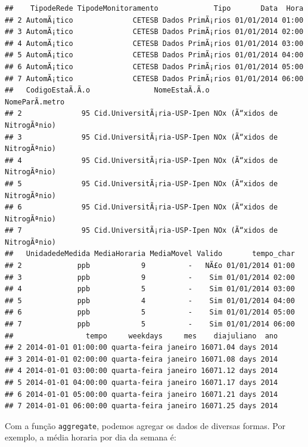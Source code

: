 \documentclass[]{book}
\newenvironment{Shaded}{\begin{snugshade}}{\end{snugshade}}
\newcommand{\KeywordTok}[1]{\textcolor[rgb]{0.13,0.29,0.53}{\textbf{#1}}}
\newcommand{\DataTypeTok}[1]{\textcolor[rgb]{0.13,0.29,0.53}{#1}}
\newcommand{\StringTok}[1]{\textcolor[rgb]{0.31,0.60,0.02}{#1}}
\newcommand{\OperatorTok}[1]{\textcolor[rgb]{0.81,0.36,0.00}{\textbf{#1}}}
\newcommand{\NormalTok}[1]{#1}
\theoremstyle{definition}
\theoremstyle{definition}
\theoremstyle{definition}
\theoremstyle{remark}
\begin{document}
\begin{verbatim}
##    TipodeRede TipodeMonitoramento             Tipo       Data  Hora
## 2 AutomÃ¡tico              CETESB Dados PrimÃ¡rios 01/01/2014 01:00
## 3 AutomÃ¡tico              CETESB Dados PrimÃ¡rios 01/01/2014 02:00
## 4 AutomÃ¡tico              CETESB Dados PrimÃ¡rios 01/01/2014 03:00
## 5 AutomÃ¡tico              CETESB Dados PrimÃ¡rios 01/01/2014 04:00
## 6 AutomÃ¡tico              CETESB Dados PrimÃ¡rios 01/01/2014 05:00
## 7 AutomÃ¡tico              CETESB Dados PrimÃ¡rios 01/01/2014 06:00
##   CodigoEstaÃ.Ã.o               NomeEstaÃ.Ã.o               NomeParÃ.metro
## 2              95 Cid.UniversitÃ¡ria-USP-Ipen NOx (Ã“xidos de NitrogÃªnio)
## 3              95 Cid.UniversitÃ¡ria-USP-Ipen NOx (Ã“xidos de NitrogÃªnio)
## 4              95 Cid.UniversitÃ¡ria-USP-Ipen NOx (Ã“xidos de NitrogÃªnio)
## 5              95 Cid.UniversitÃ¡ria-USP-Ipen NOx (Ã“xidos de NitrogÃªnio)
## 6              95 Cid.UniversitÃ¡ria-USP-Ipen NOx (Ã“xidos de NitrogÃªnio)
## 7              95 Cid.UniversitÃ¡ria-USP-Ipen NOx (Ã“xidos de NitrogÃªnio)
##   UnidadedeMedida MediaHoraria MediaMovel Valido       tempo_char
## 2             ppb            9          -   NÃ£o 01/01/2014 01:00
## 3             ppb            9          -    Sim 01/01/2014 02:00
## 4             ppb            5          -    Sim 01/01/2014 03:00
## 5             ppb            4          -    Sim 01/01/2014 04:00
## 6             ppb            5          -    Sim 01/01/2014 05:00
## 7             ppb            5          -    Sim 01/01/2014 06:00
##                 tempo     weekdays     mes    diajuliano  ano
## 2 2014-01-01 01:00:00 quarta-feira janeiro 16071.04 days 2014
## 3 2014-01-01 02:00:00 quarta-feira janeiro 16071.08 days 2014
## 4 2014-01-01 03:00:00 quarta-feira janeiro 16071.12 days 2014
## 5 2014-01-01 04:00:00 quarta-feira janeiro 16071.17 days 2014
## 6 2014-01-01 05:00:00 quarta-feira janeiro 16071.21 days 2014
## 7 2014-01-01 06:00:00 quarta-feira janeiro 16071.25 days 2014
\end{verbatim}

Com a função \texttt{aggregate}, podemos agregar os dados de diversas
formas. Por exemplo, a média horaria por dia da semana é:

\begin{Shaded}
\end{Shaded}
\end{document}
